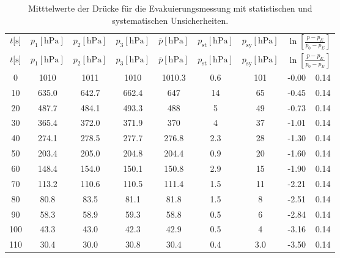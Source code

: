 \begin{longtable}{
  S[table-format=3.0] 
  S[table-format=4.2]
  S[table-format=4.2]
  S[table-format=4.2]
  S[table-format=4.2] 
  S[table-format=1.3] 
  S[table-format=3.2] 
  S[table-format=2.2] @{${}\pm{}$} S[table-format=1.2]}
  \label{tab:Dreh_Evak}
  \centering
  \caption{Mitttelwerte der Drücke für die Evakuierungsmessung mit statistischen und systematischen Unsicherheiten.}\\
  \toprule
  {$t [\si{\second}$]} &
  {$p_1 [\si{\hecto\pascal}]$} &
  {$p_2 [\si{\hecto\pascal}]$} &
  {$p_3 [\si{\hecto\pascal}]$} & 
  {$\bar{p} [\si{\hecto\pascal}]$} & 
  {$p_\text{st} [\si{\hecto\pascal}]$} & 
  {$p_\text{sy} [\si{\hecto\pascal}]$} & 
   \\
  \midrule
  \endfirsthead
  \toprule
  {$t [\si{\second}$]} & 
  {$p_1 [\si{\hecto\pascal}]$} &
  {$p_2 [\si{\hecto\pascal}]$} &
  {$p_3 [\si{\hecto\pascal}]$} & 
  {$\bar{p} [\si{\hecto\pascal}]$} & 
  {$p_\text{st} [\si{\hecto\pascal}]$} & 
  {$p_\text{sy} [\si{\hecto\pascal}]$} & 
   \\
  \midrule
     &1010  & 1011  &  1010 & 1010.3 & 0.6     & 101   & -0.00 & 0.14\\  
  10  &635.0 & 642.7 &  662.4& 647    & 14      & 65    & -0.45 & 0.14\\  
  20  &487.7 & 484.1 &  493.3& 488    & 5       & 49    & -0.73 & 0.14\\  
  30  &365.4 & 372.0 &  371.9& 370    & 4       & 37    & -1.01 & 0.14\\  
  40  &274.1 & 278.5 &  277.7& 276.8  & 2.3     & 28    & -1.30 & 0.14\\  
  50  &203.4 & 205.0 &  204.8& 204.4  & 0.9     & 20    & -1.60 & 0.14\\  
  60  &148.4 & 154.0 &  150.1& 150.8  & 2.9     & 15    & -1.90 & 0.14\\  
  70  &113.2 & 110.6 &  110.5& 111.4  & 1.5     & 11    & -2.21 & 0.14\\  
  80  &80.8  & 83.5  &  81.1 & 81.8   & 1.5     & 8     & -2.51 & 0.14\\  
  90  &58.3  & 58.9  &  59.3 & 58.8   & 0.5     & 6     & -2.84 & 0.14\\  
  100 &43.3  & 43.0  &  42.3 & 42.9   & 0.5     & 4     & -3.16 & 0.14\\  
  110 &30.4  & 30.0  &  30.8 & 30.4   & 0.4     & 3.0   & -3.50 & 0.14\\  

\end{longtable}
